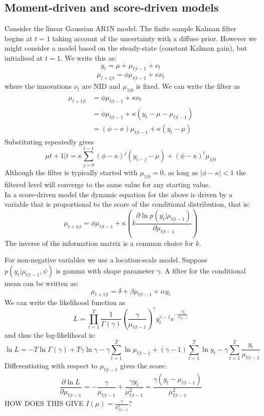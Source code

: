 \documentclass[DIV=14,titlepage=false]{scrreprt}
\begin{document}
\subsection{Moment-driven and score-driven models}
Consider the linear Gaussian AR1N model. The finite sample Kalman filter begins at $t=1$ taking account of the uncertainty with a diffuse prior. However we might consider a model based on the steady-state (constant Kalman gain), but initialised at $t=1$. We write this as:
\[
    y_t = \mu + \mu_{t|t-1} + \nu_t
\]
\[
    \mu_{t+1|t} = \phi \mu_{t|t-1} + \kappa \nu_t
\]
where the innovations $\nu_t$  are NID and $\mu_{1|0}$ is fixed. We can write the filter as
\begin{align*}
    \mu_{t+1|t} &= \phi \mu_{t|t-1} + \kappa \nu_t\\
    &= \phi \mu_{t|t-1} + \kappa (y_t - \mu - \mu_{t|t-1})\\
    &= (\phi - \kappa)\mu_{t|t-1} + \kappa (y_t - \mu)
\end{align*}
Substituting repeatedly gives 
\[
    \mu{t+1|t} = \kappa \sum_{j=0}^{t-1} (\phi - \kappa)^j (y_{t-j} - \mu) + (\phi - \kappa)^t \mu_{1|0}
\]
Although the filter is typically started with $\mu_{1|0} = 0$, as long as $|\phi - \kappa | <1$ the filtered level will converge to the same value for any starting value.\\
In a score-driven model the dynamic equation for the above is driven by a variable that is proportional to the score of the conditional distribution, that is:
\[
    \mu_{t+1|t} = \phi \mu_{t|t-1} + \kappa \left( k \frac{\partial \ln p(y_t|\mu_{t|t-1})}{\partial \mu_{t|t-1}} \right)
    \]
The inverse of the information matrix is a common choice for $k$.
\begin{example}
    For non-negative variables we use a location-scale model. Suppose $p(y_t|\mu_{t|t-1}, \psi)$ is gamma with shape parameter $\gamma$. A filter for the conditional mean can be written as:
    \[
        \mu_{t+1|t} = \delta + \beta \mu_{t|t-1} + \alpha y_t
    \]
    We can write the likelihood function as 
    \[
        L = \prod_{t=1}^T \frac{1}{\Gamma(\gamma)}\left(\frac{\gamma}{\mu_{t|t-1}}\right) ^ \gamma y_t^{\gamma-1} e^{-\frac{\gamma y_t}{\mu_{t|t-1}}}
    \]
    and thus the log-likelihood is:
    \[
        \ln L = -T \ln \Gamma(\gamma) + T \gamma \ln \gamma -\gamma \sum_{t=1}^T \ln \mu_{t|t-1} + (\gamma - 1) \sum_{t=1}^T \ln y_t - \gamma \sum_{t=1}^T \frac{y_t}{\mu_{t|t-1}}
    \]
    Differentiating with respect to $\mu_{t|t-1}$ gives the score:
    \[
        \frac{\partial \ln L}{\partial \mu_{t|t-1}} = -\frac{\gamma}{\mu_{t|t-1}} + \frac{\gamma y_t}{\mu_{t|t-1}^2} = \frac{\gamma(y_t - \mu_{t|t-1})}{\mu_{t|t-1}^2}
    \]
    HOW DOES THIS GIVE $I(\mu) = \frac{\gamma}{\mu_{t|t-1}^2}$?
\end{example}
\end{document}

